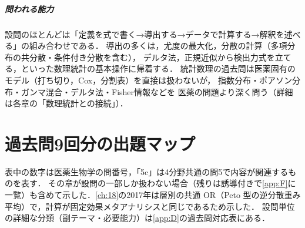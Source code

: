 \documentclass[a4paper,11pt,openany]{ltjsbook}
\begin{document}
\enlargethispage{4\baselineskip}
\paragraph{問われる能力}
設問のほとんどは「定義を式で書く→導出する→データで計算する→解釈を述べる」の組み合わせである．
導出の多くは，尤度の最大化，分散の計算（多項分布の共分散・条件付き分散を含む），
デルタ法，正規近似から検出力式を立てる，といった数理統計の基本操作に帰着する．
統計数理の過去問は医薬固有のモデル（打ち切り，Cox，分割表）を直接は扱わないが，
指数分布・ポアソン分布・ガンマ混合・デルタ法・Fisher情報などを
医薬の問題より深く問う（詳細は各章の「数理統計との接続」）．

\chapter*{過去問9回分の出題マップ}

表中の数字は医薬生物学の問番号，「5c」は4分野共通の問5で内容が関連するものを表す．
その章が設問の一部しか扱わない場合（残りは誘導付きで\cref{app:F}に一覧）も含めて示した．\cref{ch:18}の2017年は層別の共通 OR（Peto 型の逆分散重み平均）で，計算が固定効果メタアナリシスと同じであるため示した．
設問単位の詳細な分類（副テーマ・必要能力）は\cref{app:D}の過去問対応表にある．
\end{document}
